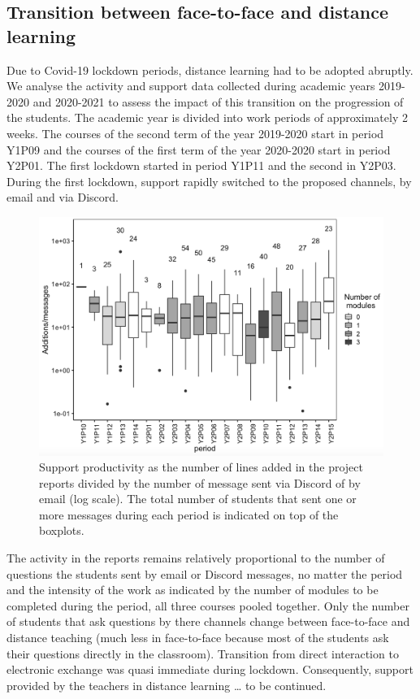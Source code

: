 \documentclass[
]{article}
\begin{document}
\hypertarget{transition-between-face-to-face-and-distance-learning}{%
\subsection{Transition between face-to-face and distance
learning}\label{transition-between-face-to-face-and-distance-learning}}

Due to Covid-19 lockdown periods, distance learning had to be adopted
abruptly. We analyse the activity and support data collected during
academic years 2019-2020 and 2020-2021 to assess the impact of this
transition on the progression of the students. The academic year is
divided into work periods of approximately 2 weeks. The courses of the
second term of the year 2019-2020 start in period Y1P09 and the courses
of the first term of the year 2020-2020 start in period Y2P01. The first
lockdown started in period Y1P11 and the second in Y2P03. During the
first lockdown, support rapidly switched to the proposed channels, by
email and via Discord.

\begin{figure}
\includegraphics[width=5.97in]{figures/add_per_message} \caption{Support productivity as the number of lines added in the project reports divided by the number of message sent via Discord of by email (log scale). The total number of students that sent one or more messages during each period is indicated on top of the boxplots.}\label{fig:timing}
\end{figure}

The activity in the reports remains relatively proportional to the
number of questions the students sent by email or Discord messages, no
matter the period and the intensity of the work as indicated by the
number of modules to be completed during the period, all three courses
pooled together. Only the number of students that ask questions by there
channels change between face-to-face and distance teaching (much less in
face-to-face because most of the students ask their questions directly
in the classroom). Transition from direct interaction to electronic
exchange was quasi immediate during lockdown. Consequently, support
provided by the teachers in distance learning \ldots{} to be continued.
\end{document}
